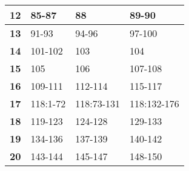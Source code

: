 \documentclass[twoside,10pt]{book}
\begin{document}
{{\begin{table}[ht]
\begin{tabular}{|cccc|}
    \multicolumn{1}{|c|}{\textbf{12}} & \multicolumn{1}{l|}{85-87} & \multicolumn{1}{l|}{88} & \multicolumn{1}{l|}{89-90} \\ \hline
    \multicolumn{1}{|c|}{\textbf{13}} & \multicolumn{1}{l|}{91-93} & \multicolumn{1}{l|}{94-96} & \multicolumn{1}{l|}{97-100} \\ \hline
    \multicolumn{1}{|c|}{\textbf{14}} & \multicolumn{1}{l|}{101-102} & \multicolumn{1}{l|}{103} & \multicolumn{1}{l|}{104} \\ \hline
    \multicolumn{1}{|c|}{\textbf{15}} & \multicolumn{1}{l|}{105} & \multicolumn{1}{l|}{106} & \multicolumn{1}{l|}{107-108} \\ \hline
    \multicolumn{1}{|c|}{\textbf{16}} & \multicolumn{1}{l|}{109-111} & \multicolumn{1}{l|}{112-114} & \multicolumn{1}{l|}{115-117} \\ \hline
    \multicolumn{1}{|c|}{\textbf{17}} & \multicolumn{1}{l|}{118:1-72} & \multicolumn{1}{l|}{118:73-131} & \multicolumn{1}{l|}{118:132-176} \\ \hline
    \multicolumn{1}{|c|}{\textbf{18}} & \multicolumn{1}{l|}{119-123} & \multicolumn{1}{l|}{124-128} & \multicolumn{1}{l|}{129-133} \\ \hline
    \multicolumn{1}{|c|}{\textbf{19}} & \multicolumn{1}{l|}{134-136} & \multicolumn{1}{l|}{137-139} & \multicolumn{1}{l|}{140-142} \\ \hline
    \multicolumn{1}{|c|}{\textbf{20}} & \multicolumn{1}{l|}{143-144} & \multicolumn{1}{l|}{145-147} & \multicolumn{1}{l|}{148-150} \\ \hline
    \end{tabular}
    \end{table}
  }
}
\end{document}
